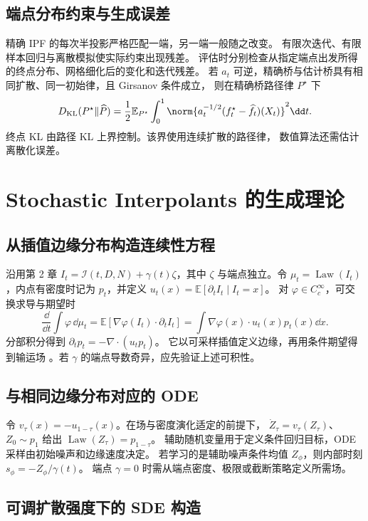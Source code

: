 \subsection{端点分布约束与生成误差}

精确 IPF 的每次半投影严格匹配一端，另一端一般随之改变。
有限次迭代、有限样本回归与离散模拟使实际约束出现残差。
评估时分别检查从指定端点出发所得的终点分布、网格细化后的变化和迭代残差。
若 \(a_t\) 可逆，精确桥与估计桥具有相同扩散、同一初始律，且 Girsanov 条件成立，
则在精确桥路径律 \(P^\star\) 下
\[
 D_{\mathrm{KL}}(P^\star\|\widehat P)
 =\frac12\mathbb E_{P^\star}\int_0^1
 \norm{a_t^{-1/2}(f_t^\star-\widehat f_t)(X_t)}^2\dd t.
\]
终点 KL 由路径 KL 上界控制。该界使用连续扩散的路径律，
数值算法还需估计离散化误差。

\section{Stochastic Interpolants 的生成理论}
\label{sec:generation-si}

\subsection{从插值边缘分布构造连续性方程}

沿用第 2 章 \(I_t=\mathcal I(t,D,N)+\gamma(t)\zeta\)，其中
\(\zeta\) 与端点独立。令 \(\mu_t=\operatorname{Law}(I_t)\)，内点有密度时记为 \(p_t\)，并定义
\(u_t(x)=\mathbb E[\partial_t I_t\mid I_t=x]\)。
对 \(\varphi\in C_c^\infty\)，可交换求导与期望时
\[
 \frac{\dd}{\dd t}\int\varphi\,\dd\mu_t
 =\mathbb E[\nabla\varphi(I_t)\cdot\partial_t I_t]
 =\int\nabla\varphi(x)\cdot u_t(x)p_t(x)\dd x.
\]
分部积分得到 \(\partial_t p_t=-\nabla\cdot(u_tp_t)\)。
它以可采样插值定义边缘，再用条件期望得到输运场
\cite{albergo2025si}。若 \(\gamma\) 的端点导数奇异，应先验证上述可积性。

\subsection{与相同边缘分布对应的 ODE}

令 \(v_\tau(x)=-u_{1-\tau}(x)\)。在场与密度演化适定的前提下，
\(\dot Z_\tau=v_\tau(Z_\tau)\)、\(Z_0\sim p_1\)
给出 \(\operatorname{Law}(Z_\tau)=p_{1-\tau}\)。
辅助随机变量用于定义条件回归目标，ODE 采样由初始噪声和边缘速度决定。
若学习的是辅助噪声条件均值 \(Z_\phi\)，则内部时刻
\(s_\phi=-Z_\phi/\gamma(t)\)。
端点 \(\gamma=0\) 时需从端点密度、极限或截断策略定义所需场。

\subsection{可调扩散强度下的 SDE 构造}


